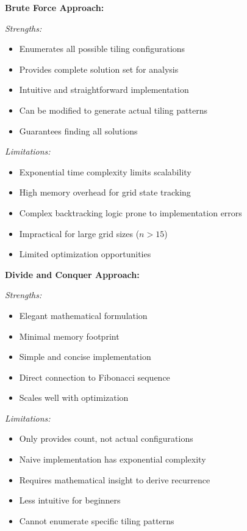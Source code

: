 \documentclass[conference]{IEEEtran}
\begin{document}
\textbf{Brute Force Approach:}

\textit{Strengths:}
\begin{itemize}
    \item Enumerates all possible tiling configurations
    \item Provides complete solution set for analysis
    \item Intuitive and straightforward implementation
    \item Can be modified to generate actual tiling patterns
    \item Guarantees finding all solutions
\end{itemize}

\textit{Limitations:}
\begin{itemize}
    \item Exponential time complexity limits scalability
    \item High memory overhead for grid state tracking
    \item Complex backtracking logic prone to implementation errors
    \item Impractical for large grid sizes ($n > 15$)
    \item Limited optimization opportunities
\end{itemize}

\textbf{Divide and Conquer Approach:}

\textit{Strengths:}
\begin{itemize}
    \item Elegant mathematical formulation
    \item Minimal memory footprint
    \item Simple and concise implementation
    \item Direct connection to Fibonacci sequence
    \item Scales well with optimization
\end{itemize}

\textit{Limitations:}
\begin{itemize}
    \item Only provides count, not actual configurations
    \item Naive implementation has exponential complexity
    \item Requires mathematical insight to derive recurrence
    \item Less intuitive for beginners
    \item Cannot enumerate specific tiling patterns
\end{itemize}
\end{document}
